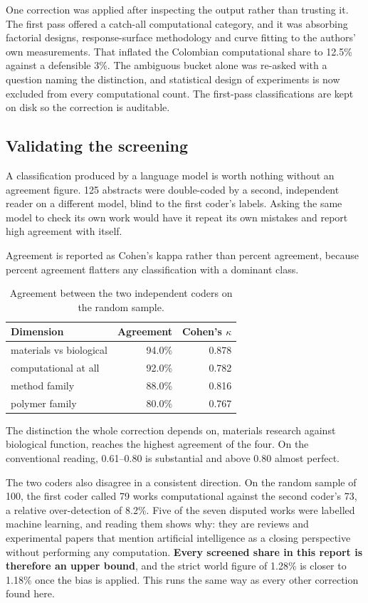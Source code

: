 \documentclass[11pt,a4paper]{article}
\begin{document}
One correction was applied after inspecting the output rather than trusting it. The first
pass offered a catch-all computational category, and it was absorbing factorial designs,
response-surface methodology and curve fitting to the authors' own measurements. That
inflated the Colombian computational share to 12.5\% against a defensible 3\%. The ambiguous
bucket alone was re-asked with a question naming the distinction, and statistical design of
experiments is now excluded from every computational count. The first-pass classifications
are kept on disk so the correction is auditable.

\subsection{Validating the screening}
\label{sec:validation}

A classification produced by a language model is worth nothing without an agreement figure.
125 abstracts were double-coded by a second, independent reader on a different model,
blind to the first coder's labels. Asking the same model to check its own work would have
it repeat its own mistakes and report high agreement with itself.

Agreement is reported as Cohen's kappa rather than percent agreement, because percent
agreement flatters any classification with a dominant class.


\begin{table}[htbp]
\centering
\caption{Agreement between the two independent coders on the random sample.}
\label{tab:validation}
\small
\begin{tabular}{lrr}
\toprule
Dimension & Agreement & Cohen's $\kappa$ \\
\midrule
materials vs biological & 94.0\% & 0.878 \\
computational at all & 92.0\% & 0.782 \\
method family & 88.0\% & 0.816 \\
polymer family & 80.0\% & 0.767 \\
\bottomrule
\end{tabular}
\end{table}


The distinction the whole correction depends on, materials research against biological
function, reaches the highest agreement of the four. On the conventional reading, 0.61--0.80
is substantial and above 0.80 almost perfect.

The two coders also disagree in a consistent direction. On the random sample of 100, the
first coder called 79 works computational against the second coder's 73, a relative
over-detection of 8.2\%. Five of the seven disputed works were labelled machine learning,
and reading them shows why: they are reviews and experimental papers that mention artificial
intelligence as a closing perspective without performing any computation. \textbf{Every
screened share in this report is therefore an upper bound}, and the strict world figure of
1.28\%
is closer to 1.18\% once the bias is applied. This runs the same way as every other
correction found here.
\end{document}
